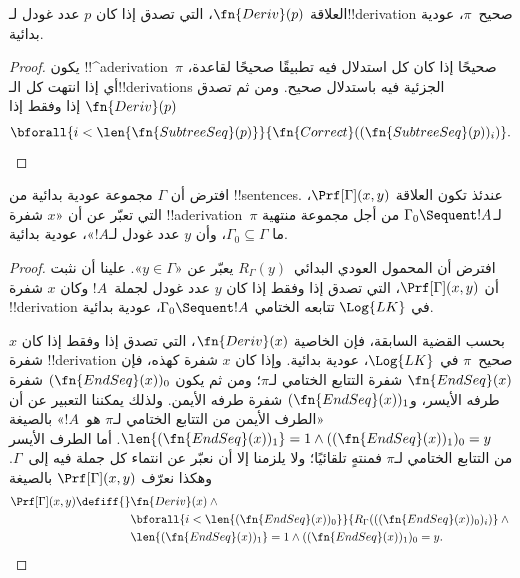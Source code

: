 \documentclass[../../../include/open-logic-section]{subfiles}
\begin{document}
\begin{prop}
  العلاقة $\fn{Deriv}(p)$، التي تصدق إذا كان $p$ عدد غودل
  لـ!!{derivation} صحيح~$\pi$، عودية بدائية.
\end{prop}

\begin{proof}
  يكون !!^a{derivation}~$\pi$ صحيحًا إذا كان كل استدلال فيه تطبيقًا
  صحيحًا لقاعدة، أي إذا انتهت كل الـ!!{derivation}s الجزئية فيه باستدلال
  صحيح. ومن ثم تصدق $\fn{Deriv}(p)$ إذا وفقط إذا
  \[
  \bforall{i<\len{\fn{SubtreeSeq}(p)}}{\fn{Correct}((\fn{SubtreeSeq}(p))_i)}.
  \]
\end{proof}


\begin{prop}
افترض أن $\Gamma$ مجموعة عودية بدائية من !!{sentence}s. عندئذ تكون
العلاقة $\Prf[\Gamma](x,y)$، التي تعبّر عن أن «$x$ شفرة
!!a{derivation}~$\pi$ لـ$\Gamma_0 \Sequent !A$ من أجل مجموعة منتهية ما
$\Gamma_0\subseteq\Gamma$، وأن $y$ عدد غودل لـ$!A$»، عودية بدائية.
\end{prop}

\begin{proof}
افترض أن المحمول العودي البدائي~$R_\Gamma(y)$ يعبّر عن
«$y\in\Gamma$». علينا أن نثبت أن $\Prf[\Gamma](x,y)$، التي تصدق إذا
وفقط إذا كان $y$ عدد غودل لجملة~$!A$ وكان $x$ شفرة !!{derivation} في
$\Log{LK}$ تتابعه الختامي $\Gamma_0 \Sequent !A$، عودية بدائية.

بحسب القضية السابقة، فإن الخاصية $\fn{Deriv}(x)$، التي تصدق إذا وفقط
إذا كان $x$ شفرة !!{derivation} صحيح~$\pi$ في $\Log{LK}$، عودية
بدائية. وإذا كان $x$ شفرة كهذه، فإن $\fn{EndSeq}(x)$ شفرة التتابع
الختامي لـ$\pi$؛ ومن ثم يكون $(\fn{EndSeq}(x))_0$ شفرة طرفه الأيسر،
و$(\fn{EndSeq}(x))_1$ شفرة طرفه الأيمن. ولذلك يمكننا التعبير عن أن
«الطرف الأيمن من التتابع الختامي لـ$\pi$ هو~$!A$» بالصيغة
$\len{(\fn{EndSeq}(x))_1}=1 \land ((\fn{EndSeq}(x))_1)_0=y$. أما الطرف
الأيسر من التتابع الختامي لـ$\pi$ فمنتهٍ تلقائيًا؛ ولا يلزمنا إلا أن
نعبّر عن انتماء كل جملة فيه إلى~$\Gamma$. وهكذا نعرّف
$\Prf[\Gamma](x,y)$ بالصيغة
\begin{align*}
\Prf[\Gamma](x, y) \defiff {}&
\fn{Deriv}(x) \land {} \\
& \bforall{i <
  \len{(\fn{EndSeq}(x))_0}}{R_\Gamma(((\fn{EndSeq}(x))_0)_i)} \land {}\\
& \len{(\fn{EndSeq}(x))_1} = 1 \land ((\fn{EndSeq}(x))_1)_0 = y.
\end{align*}
\end{proof}
\end{document}
